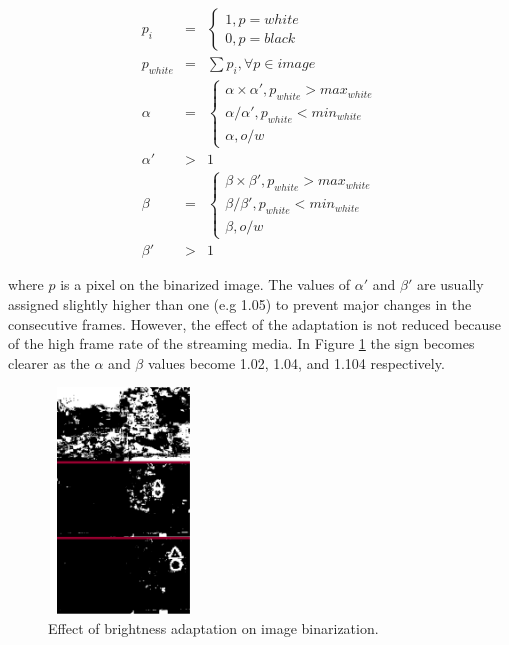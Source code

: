 \documentclass[review,number]{elsarticle}
\begin{document}
\begin{eqnarray}
\label{eq3}
p_{i} &=& \left\{\begin{array}{l} 1, p=white \\ 0, p=black \end{array} \right.\\
\nonumber p_{white} &=& \sum{p_{i}}, \forall p \in image \\
\nonumber \alpha &=& \left\{\begin{array}{l} \alpha \times \alpha', p_{white}>max_{white} \\ \alpha/\alpha', p_{white}<min_{white} \\ \alpha, o/w \end{array} \right.\\
\nonumber \alpha' &>& 1\\
\nonumber \beta &=& \left\{\begin{array}{l} \beta \times \beta', p_{white}>max_{white} \\ \beta/\beta', p_{white}<min_{white} \\ \beta, o/w \end{array} \right.\\
\nonumber \beta' &>& 1
\end{eqnarray}

\noindent where $p$ is a pixel on the binarized image. The values of $\alpha'$ and $\beta'$ are usually assigned slightly higher than one (e.g 1.05) to prevent major changes in the consecutive frames. However, the effect of the adaptation is not reduced because of the high frame rate of the streaming media. In Figure \ref{fig:adapbright} the sign becomes clearer as the $\alpha$ and $\beta$ values become 1.02, 1.04, and 1.104 respectively.

\begin{figure}[H]
\begin{center}
\includegraphics[width=40mm,height=60mm]{img/adapbright.eps}
\caption{Effect of brightness adaptation on image binarization.}
\label{fig:adapbright}
\end{center}
\end{figure}
\end{document}
